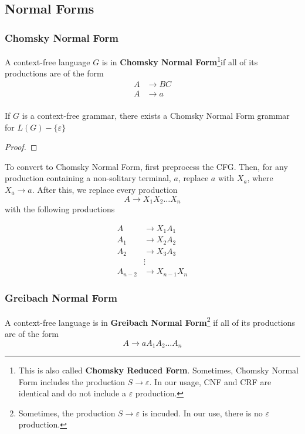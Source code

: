 \subsection{Normal Forms}\label{subsec:normal-forms}
\subsubsection{Chomsky Normal Form}\label{subsubsec:chomsky-normal-form}
\begin{definition}
    A context-free language \(G\) is in \textbf{Chomsky Normal Form}\footnote{This is also called \textbf{Chomsky Reduced Form}. Sometimes, Chomsky Normal Form includes the production \(S\to\varepsilon \). In our usage, CNF and CRF are identical and do not include a \(\varepsilon \) production.}if all of its productions are of the form 
    \begin{align*}A &\to BC\\
                  A &\to a\\
    \end{align*}
\end{definition}

\begin{theorem}
    If \(G\) is a context-free grammar, there exists a Chomsky Normal Form grammar for \(L(G)-\{\varepsilon \} \)
\end{theorem}

\begin{proof}

\end{proof}

To convert to Chomsky Normal Form, first preprocess the CFG\@. Then, for any production containing a non-solitary terminal, \(a\), replace \(a\) with \(X_a\), where \(X_a\to a\). After this, we replace every production \[A\to X_1X_2\hdots X_n\] with the following productions

\begin{align*}
    A &\to X_1 A_1 \\
    A_1 &\to X_2 A_2 \\
    A_2 &\to X_3 A_3 \\
        &\vdots \\
    A_{n-2} &\to X_{n-1} X_n
\end{align*}

\subsubsection{Greibach Normal Form}\label{subsubsec:greibach-normal-form}
\begin{definition}
    A context-free language is in \textbf{Greibach Normal Form}\footnote{Sometimes, the production \(S\to\varepsilon \) is incuded. In our use, there is no \(\varepsilon \) production.} if all of its productions are of the form
    \[A\to aA_1A_2\hdots A_n\]
\end{definition}

